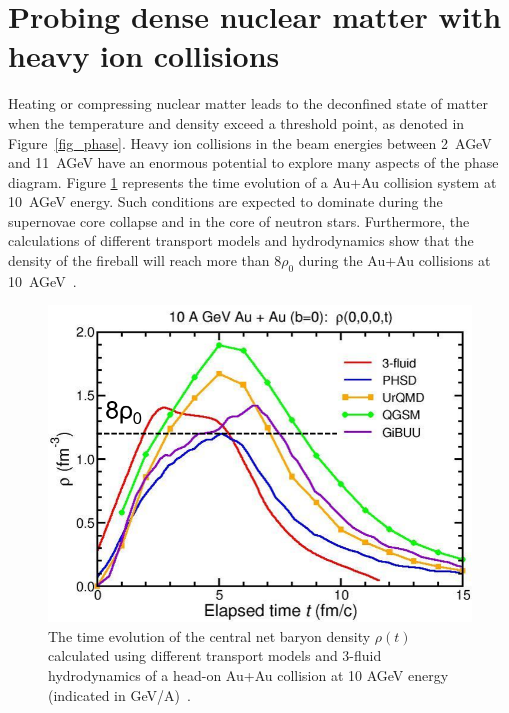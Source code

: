 \section{Probing dense nuclear matter with heavy ion collisions}

Heating or compressing nuclear matter leads to the deconfined state of matter when the temperature and density exceed a threshold point, as denoted in Figure~\ref{fig_phase}. Heavy ion collisions in the beam energies between 2~AGeV and 11~AGeV have an enormous potential to explore many aspects of the phase diagram. Figure \ref{fig:cbm_density} represents the time evolution of a Au+Au collision system at 10~AGeV energy. Such conditions are expected to dominate during the supernovae core collapse and in the core of neutron stars. Furthermore, the calculations of different transport models and hydrodynamics show that the density of the fireball will reach more than $8\rho_{0}$ during the Au+Au collisions at 10~AGeV~\cite{CBM_physics}.
\newpage
\begin{figure}[!h]
    \centering
    \includegraphics[width=0.65\columnwidth]{Chapter1/images/CBM_density.png}
    \caption{The time evolution of the central net baryon density $\rho(t)$ calculated using different transport models and 3-fluid hydrodynamics of a head-on Au+Au collision at 10 AGeV energy (indicated in GeV/A)~\cite{CBM_physics}.}
    \label{fig:cbm_density}
\end{figure}

